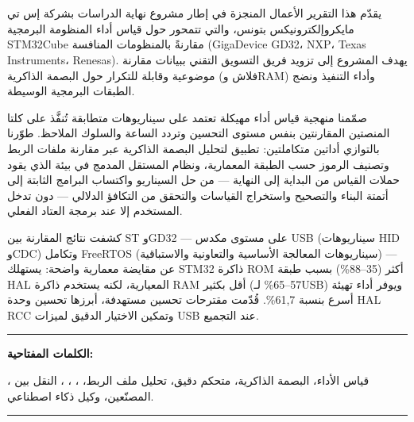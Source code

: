 \chapter*{}

\begin{RLtext}

\noindent يقدّم هذا التقرير الأعمال المنجزة في إطار مشروع نهاية الدراسات بشركة إس تي مايكروإلكترونيكس بتونس، والتي تتمحور حول قياس أداء المنظومة البرمجية STM32Cube مقارنةً بالمنظومات المنافسة (GigaDevice GD32، NXP، Texas Instruments، Renesas). يهدف المشروع إلى تزويد فريق التسويق التقني ببيانات مقارنة موضوعية وقابلة للتكرار حول البصمة الذاكرية (فلاش وRAM) وأداء التنفيذ ونضج الطبقات البرمجية الوسيطة.

صمّمنا منهجية قياس أداء مهيكلة تعتمد على سيناريوهات متطابقة تُنفَّذ على كلتا المنصتين المقارنتين بنفس مستوى التحسين وتردد الساعة والسلوك الملاحظ. طوّرنا بالتوازي أداتين متكاملتين: تطبيق  لتحليل البصمة الذاكرية عبر مقارنة ملفات الربط وتصنيف الرموز حسب الطبقة المعمارية، ونظام  المستقل المدمج في بيئة  الذي يقود حملات القياس من البداية إلى النهاية --- من حل السيناريو واكتساب البرامج الثابتة إلى أتمتة البناء والتصحيح واستخراج القياسات والتحقق من التكافؤ الدلالي --- دون تدخل المستخدم إلا عند برمجة العتاد الفعلي.

كشفت نتائج المقارنة بين ST وGD32 --- على مستوى مكدس USB (سيناريوهات HID وCDC) وتكامل FreeRTOS (سيناريوهات المعالجة الأساسية والتعاونية والاستباقية) --- عن مقايضة معمارية واضحة: يستهلك STM32 ذاكرة ROM أكثر (35--88\%) بسبب طبقة HAL المعيارية، لكنه يستخدم ذاكرة RAM أقل بكثير (57--65\% لـUSB) ويوفر أداء تهيئة أسرع بنسبة 61,7\%. قُدّمت مقترحات تحسين مستهدفة، أبرزها تحسين وحدة HAL RCC وتمكين الاختيار الدقيق لميزات USB عند التجميع.

\end{RLtext}

\noindent\rule[2pt]{\textwidth}{0.5pt}

\begin{RLtext}

{\textbf{الكلمات المفتاحية:}}

، قياس الأداء، البصمة الذاكرية، متحكم دقيق، تحليل ملف الربط، ، ، ، النقل بين المصنّعين، وكيل ذكاء اصطناعي.
\\

\end{RLtext}

\noindent\rule[2pt]{\textwidth}{0.5pt}